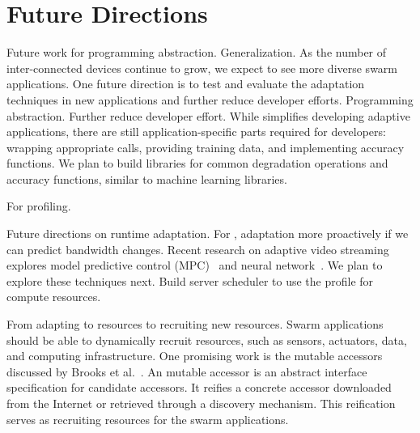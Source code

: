 \documentclass[thesis.tex]{subfiles}
\begin{document}
\section{Future Directions}
\label{sec:future-directions}

Future work for programming abstraction. Generalization. As the number of
inter-connected devices continue to grow, we expect to see more diverse swarm
applications. One future direction is to test and evaluate the adaptation
techniques in new applications and further reduce developer efforts. Programming
abstraction. Further reduce developer effort. While \awstream{} simplifies
developing adaptive applications, there are still application-specific parts
required for developers: wrapping appropriate \maybe{} calls, providing training
data, and implementing accuracy functions. We plan to build libraries for common
degradation operations and accuracy functions, similar to machine learning
libraries.

For profiling.

Future directions on runtime adaptation. For \awstream{}, adaptation more
proactively if we can predict bandwidth changes. Recent research on adaptive
video streaming explores model predictive control (MPC)~\cite{yin2015control,
  sun2016cs2p} and neural network~\cite{mao2017neural}. We plan to explore these
techniques next. Build server scheduler to use the profile for compute
resources.

From adapting to resources to recruiting new resources. Swarm applications
should be able to dynamically recruit resources, such as sensors, actuators,
data, and computing infrastructure. One promising work is the mutable accessors
discussed by Brooks et al.~\cite{brooks2018component}. An mutable accessor is an
abstract interface specification for candidate accessors. It reifies a concrete
accessor downloaded from the Internet or retrieved through a discovery
mechanism. This reification serves as recruiting resources for the swarm
applications.
\end{document}
